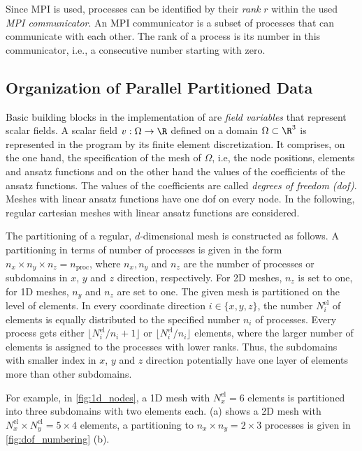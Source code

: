 Since MPI is used, processes can be identified by their \emph{rank} $r$ within the used \emph{MPI communicator}. An MPI communicator is a subset of processes that can communicate with each other. The rank of a process is its number in this communicator, i.e., a consecutive number starting with zero.

\subsection{Organization of Parallel Partitioned Data}\label{sec:oragnization_of_parallel_partitioned_data}

Basic building blocks in the implementation of \opendihu{} are \emph{field variables} that represent scalar fields.
A scalar field $v : \Omega \to \R$ defined on a domain $\Omega \subset \R^3$ is represented in the program by its finite element discretization. It comprises, on the one hand, the specification of the mesh of $\Omega$, i.e, the node positions, elements and ansatz functions and on the other hand the values of the coefficients of the ansatz functions. The values of the coefficients are called \emph{degrees of freedom (dof)}. Meshes with linear ansatz functions have one dof on every node. In the following, regular cartesian meshes with linear ansatz functions are considered.

The partitioning of a regular, $d$-dimensional mesh is constructed as follows. A partitioning in terms of number of processes is given in the form $n_x \times n_y \times n_z = n_\text{proc}$, where $n_x,n_y$ and $n_z$ are the number of processes or subdomains in $x$, $y$ and $z$ direction, respectively. For 2D meshes, $n_z$ is set to one, for 1D meshes, $n_y$ and $n_z$ are set to one. The given mesh is partitioned on the level of elements. In every coordinate direction $i \in \{x,y,z\}$, the number $N^\text{el}_i$ of elements is equally distributed to the specified number $n_i$ of processes. Every process gets either $\lfloor N^\text{el}_i/n_i+1\rfloor$ or $\lfloor N^\text{el}_i/n_i \rfloor$ elements, where the larger number of elements is assigned to the processes with lower ranks. Thus, the subdomains with smaller index in $x$, $y$ and $z$ direction potentially have one layer of elements more than other subdomains.

For example, in \cref{fig:1d_nodes}, a 1D mesh with $N^\text{el}_x=6$ elements is partitioned into three subdomains with two elements each. 
 (a) shows a 2D mesh with $N^\text{el}_x \times N^\text{el}_y = 5 \times 4$ elements, a partitioning to $n_x \times n_y = 2 \times 3$ processes is given in \cref{fig:dof_numbering} (b).


